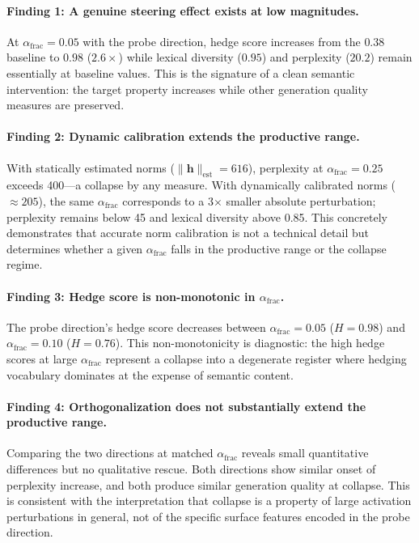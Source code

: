 \documentclass[11pt,a4paper]{article}
\begin{document}
\paragraph{Finding 1: A genuine steering effect exists at low magnitudes.}
At $\alpha_{\mathrm{frac}} = 0.05$ with the probe direction, hedge score
increases from the $0.38$ baseline to $0.98$ ($2.6\times$) while lexical
diversity ($0.95$) and perplexity ($20.2$) remain essentially at baseline
values. This is the signature of a clean semantic intervention: the
target property increases while other generation quality measures are
preserved.

\paragraph{Finding 2: Dynamic calibration extends the productive range.}
With statically estimated norms ($\|\mathbf{h}\|_{\text{est}} = 616$),
perplexity at $\alpha_{\mathrm{frac}} = 0.25$ exceeds 400---a collapse
by any measure. With dynamically calibrated norms ($\approx 205$), the
same $\alpha_{\mathrm{frac}}$ corresponds to a 3$\times$ smaller absolute
perturbation; perplexity remains below 45 and lexical diversity above
0.85. This concretely demonstrates that accurate norm calibration is not
a technical detail but determines whether a given $\alpha_{\mathrm{frac}}$
falls in the productive range or the collapse regime.

\paragraph{Finding 3: Hedge score is non-monotonic in $\alpha_{\mathrm{frac}}$.}
The probe direction's hedge score decreases between
$\alpha_{\mathrm{frac}} = 0.05$ ($H = 0.98$) and
$\alpha_{\mathrm{frac}} = 0.10$ ($H = 0.76$). This non-monotonicity is
diagnostic: the high hedge scores at large $\alpha_{\mathrm{frac}}$
represent a collapse into a degenerate register where hedging vocabulary
dominates at the expense of semantic content.

\paragraph{Finding 4: Orthogonalization does not substantially extend the productive range.}
Comparing the two directions at matched $\alpha_{\mathrm{frac}}$ reveals
small quantitative differences but no qualitative rescue. Both directions
show similar onset of perplexity increase, and both produce similar
generation quality at collapse. This is consistent with the interpretation
that collapse is a property of large activation perturbations in general,
not of the specific surface features encoded in the probe direction.
\end{document}
